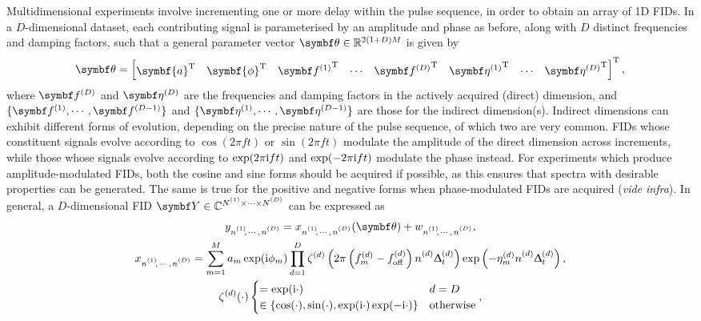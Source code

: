 Multidimensional experiments involve incrementing one or more delay within the
pulse sequence, in order to obtain an array of \ac{1D} \acp{FID}. In a
$D$-dimensional dataset, each contributing signal is parameterised by an
amplitude and phase as before, along with $D$ distinct frequencies and damping
factors, such that a general parameter vector  $\bth \in \mathbb{R}^{2(1+D)M}$
is given by
\begin{equation}
    \bth =
    \begin{bmatrix}
    \symbf{a}\T &
    \symbf{\phi}\T &
    {\bdfone}\T &
    \cdots &
    {\bdfD}\T &
    {\bdetaone}\T &
    \cdots &
    {\bdetaD}\T
    \end{bmatrix}\T,
    \label{eq:theta}
\end{equation}
where $\bdfD$ and $\bdetaD$ are the frequencies and damping factors in the
actively acquired (direct) dimension, and $\lbrace \bdfone, \cdots,
\bdfDminusone \rbrace$ and
$\lbrace \bdetaone, \cdots, \bdetaDminusone \rbrace$ are those for the indirect
dimension(s).
Indirect dimensions can exhibit different forms of evolution, depending on
the precise nature of the pulse sequence, of which two are very
common\cite[Section 4.3.4]{Cavanagh2007}. \acp{FID} whose constituent signals
evolve according to $\cos(2 \pi f t)$ or $\sin(2 \pi f t)$ modulate the
amplitude of the direct dimension across increments, while those whose signals
evolve according to $\exp(2 \pi \mathrm{i} f t)$ and $\exp(-2 \pi \mathrm{i} f t)$ modulate
the phase instead.
For experiments which produce amplitude-modulated \acp{FID},
both the cosine and sine forms should be acquired if possible, as this ensures
that spectra with desirable properties can be generated. The same is true for the positive
and negative forms when phase-modulated \acp{FID} are acquired (\emph{vide
infra}). In general, a $D$-dimensional \ac{FID} $\bY \in \mathbb{C}^{\None
\times \cdots \times \ND}$ can be expressed as
\begin{subequations}
    \begin{gather}
        \ynonenD = \xnonenD(\bth) + \wnonenD,\\
        \xnonenD
            = \sumM \amexpphim \prodD
            \zeta^{(d)}\left(2 \pi \left(f^{(d)}_m  - \foffd\right) \nd \Dtd\right)
            \exp\left(-\eta^{(d)}_m \nd \Dtd\right),\\
        \zeta^{(d)}(\cdot)
        \begin{cases}
            = \exp(\iu\cdot) & d = D \\
            \in \left\lbrace \cos(\cdot), \sin(\cdot), \exp(\iu\cdot) \exp(-\iu\cdot)\right\rbrace & \text{otherwise}
        \end{cases},
    \end{gather}
    \label{eq:general-fid}%
\end{subequations}%

